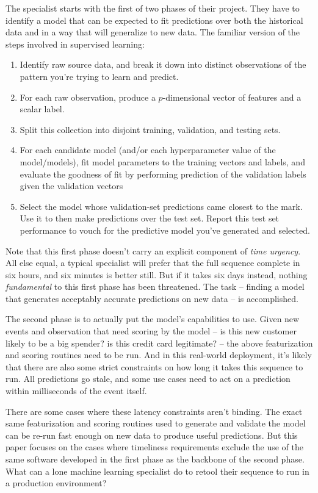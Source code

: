 \documentclass{article}
\begin{document}
 The specialist starts with the first of two phases of their project. They have
to identify a model that can be expected to fit predictions over both the
historical data and in a way that will generalize to new data. The familiar
version of the steps involved in supervised learning:

\begin{enumerate}
 \item Identify raw source data, and break it down into distinct observations of
the pattern you're trying to learn and predict.
 \item For each raw observation, produce a $p$-dimensional vector of features
and a scalar label.
 \item Split this collection into disjoint training, validation, and testing
sets.
 \item For each candidate model (and/or each hyperparameter value of the
model/models), fit model parameters to the training vectors and labels, and
evaluate the goodness of fit by performing prediction of the validation labels
given the validation vectors
 \item Select the model whose validation-set predictions came closest to the
mark. Use it to then make predictions over the test set. Report this test set
performance to vouch for the predictive model you've generated and selected.
\end{enumerate}

 Note that this first phase doesn't carry an explicit component of \emph{time
urgency}. All else equal, a typical specialist will prefer that the full
sequence complete in six hours, and six minutes is better still. But if it takes
six days instead, nothing \emph{fundamental} to this first phase has been
threatened. The task -- finding a model that generates acceptably accurate
predictions on new data -- is accomplished.

 The second phase is to actually put the model's capabilities to use. Given new
events and observation that need scoring by the model -- is this new customer
likely to be a big spender? is this credit card legitimate? -- the above
featurization and scoring routines need to be run. And in this real-world
deployment, it's likely that there are also some strict constraints on how long
it takes this sequence to run. All predictions go stale, and some use cases need
to act on a prediction within milliseconds of the event itself.

 There are some cases where these latency constraints aren't binding. The exact
same featurization and scoring routines used to generate and validate the model
can be re-run fast enough on new data to produce useful predictions. But this
paper focuses on the cases where timeliness requirements exclude the use of the
same software developed in the first phase as the backbone of the second phase.
What can a lone machine learning specialist do to retool their sequence to run
in a production environment?
\end{document}
